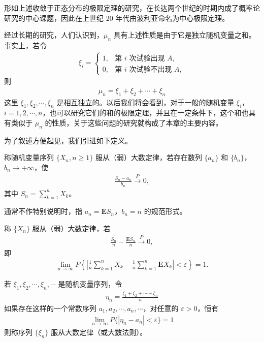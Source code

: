 \documentclass[../../main.tex]{subfiles}
\begin{document}
形如上述收敛于正态分布的极限定理的研究，在长达两个世纪的时期内成了概率论研究的中心课题，因此在上世纪 20 年代由波利亚命名为中心极限定理。

经过长期的研究，人们认识到，$\mu_n$ 具有上述性质是由于它是独立随机变量之和。事实上，若令
\begin{align}
\xi_i=
\begin{cases}
1,&\text{第 }i\text{ 次试验出现 }A,\\
0,&\text{第 }i\text{ 次试验不出现 }A,
\end{cases}\label{align:ch05-伯努利指示变量}
\end{align}
则
\begin{align}
\mu_n=\xi_1+\xi_2+\cdots+\xi_n
\end{align}
这里 $\xi_1,\xi_2,\cdots,\xi_n$ 是相互独立的。以后我们将会看到，对于一般的随机变量 $\xi_i$，$i=1,2,\cdots,n$，也可以研究它们的和的极限定理，并且在一定条件下，这个和也具有类似于 $\mu_n$ 的性质，关于这些问题的研究就构成了本章的主要内容。

为了叙述方便起见，我们引进如下定义。

\begin{definition}[(弱)大数定律]\label{definition:ch05-弱大数定律}
称随机变量序列 $\{X_n,n\geqslant1\}$ 服从（弱）大数定律，若存在数列 $\{a_n\}$ 和 $\{b_n\}$，$b_n\to+\infty$，使
\begin{align*}
\frac{S_n-a_n}{b_n}\xrightarrow{P}0,
\end{align*}
其中 $S_n=\sum_{k=1}^{n}X_k$。
\end{definition}

\begin{note}
通常不作特别说明时，指 $a_n=\boldsymbol{E}S_n$，$b_n=n$ 的规范形式。
\end{note}

\begin{definition}[(弱)大数定律的规范形式]\label{definition:ch05-弱大数定律规范形式}
称 $\{X_n\}$ 服从（弱）大数定律，若
\begin{align*}
\frac{S_n}{n}-\frac{\boldsymbol{E}S_n}{n}\xrightarrow{P}0,
\end{align*}
即
\begin{align*}
\lim_{n\to\infty}P\!\left\{\left|\frac1n\sum_{k=1}^{n}X_k-\frac1n\sum_{k=1}^{n}\boldsymbol{E}X_k\right|<\varepsilon\right\}=1.
\end{align*}
\end{definition}

\begin{definition}[大数定律]\label{definition:ch05-大数定律}
若 $\xi_1,\xi_2,\cdots,\xi_n,\cdots$ 是随机变量序列，令
\begin{align}
\eta_n=\frac{\xi_1+\xi_2+\cdots+\xi_n}{n}\label{align:ch05-算术平均}
\end{align}
如果存在这样的一个常数序列 $a_1,a_2,\cdots,a_n,\cdots$，对任意的 $\varepsilon>0$，恒有
\begin{align}
\lim_{n\to\infty}P\{|\eta_n-a_n|<\varepsilon\}=1
\end{align}
则称序列 $\{\xi_n\}$ 服从大数定律（或大数法则）。
\end{definition}
\end{document}
